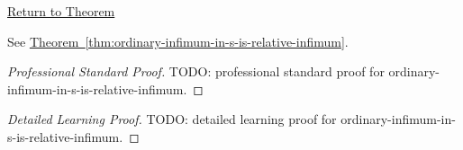 \newpage
{}
\label{prf:ordinary-infimum-in-s-is-relative-infimum}

\begin{remark*}[Return]
\hyperref[thm:ordinary-infimum-in-s-is-relative-infimum]{Return to Theorem}
\end{remark*}

\begin{theorem*}
See \hyperref[thm:ordinary-infimum-in-s-is-relative-infimum]{Theorem~\ref*{thm:ordinary-infimum-in-s-is-relative-infimum}}.
\end{theorem*}

\begin{proof}[Professional Standard Proof]
\LRAProofBodyStart
TODO: professional standard proof for ordinary-infimum-in-s-is-relative-infimum.
\end{proof}

\begin{proof}[Detailed Learning Proof]
\LRAProofBodyStart
TODO: detailed learning proof for ordinary-infimum-in-s-is-relative-infimum.
\end{proof}

\begin{remark*}
\end{remark*}

\begin{dependencies}
\NoLocalDependencies
\end{dependencies}

\clearpage
